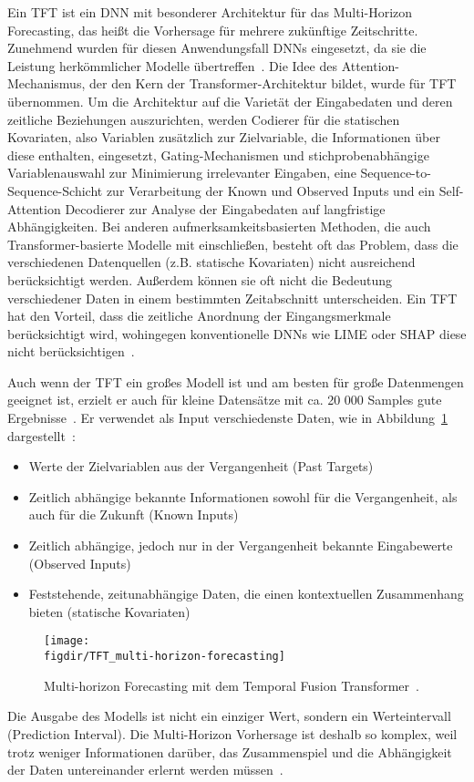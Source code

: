 Ein \ac{TFT} ist ein \ac{DNN} mit besonderer Architektur für das Multi-Horizon Forecasting, das heißt die Vorhersage für mehrere zukünftige Zeitschritte.
Zunehmend wurden für diesen Anwendungsfall \acp{DNN} eingesetzt, da sie die Leistung herkömmlicher Modelle übertreffen~\cite{Lim.19.12.2019}.
Die Idee des Attention-Mechanismus, der den Kern der Transformer-Architektur bildet, wurde für \ac{TFT} übernommen.
Um die Architektur auf die Varietät der Eingabedaten und deren zeitliche Beziehungen auszurichten, werden Codierer für die statischen Kovariaten, also Variablen zusätzlich zur Zielvariable, die Informationen über diese enthalten, eingesetzt, Gating-Mechanismen und stichprobenabhängige Variablenauswahl zur Minimierung irrelevanter Eingaben, eine Sequence-to-Sequence-Schicht zur Verarbeitung der Known und Observed Inputs und ein Self-Attention Decodierer zur Analyse der Eingabedaten auf langfristige Abhängigkeiten.
Bei anderen aufmerksamkeitsbasierten Methoden, die auch Transformer-basierte Modelle mit einschließen, besteht oft das Problem, dass die verschiedenen Datenquellen (z.B. statische Kovariaten) nicht ausreichend berücksichtigt werden.
Außerdem können sie oft nicht die Bedeutung verschiedener Daten in einem bestimmten Zeitabschnitt unterscheiden.
Ein \ac{TFT} hat den Vorteil, dass die zeitliche Anordnung der Eingangsmerkmale berücksichtigt wird, wohingegen konventionelle \acp{DNN} wie LIME oder SHAP diese nicht berücksichtigen~\cite{Lim.19.12.2019}.

Auch wenn der \ac{TFT} ein großes Modell ist und am besten für große Datenmengen geeignet ist, erzielt er auch für kleine Datensätze mit ca. 20 000 Samples gute Ergebnisse~\cite{Beitner.2020}.
Er verwendet als Input verschiedenste Daten, wie in Abbildung~\ref{FIG:tft-forecasting} dargestellt~\cite{Lim.19.12.2019}:
\begin{itemize}
 \item Werte der Zielvariablen aus der Vergangenheit (Past Targets)
 \item Zeitlich abhängige bekannte Informationen sowohl für die Vergangenheit, als auch für die Zukunft (Known Inputs)
 \item Zeitlich abhängige, jedoch nur in der Vergangenheit bekannte Eingabewerte (Observed Inputs)
 \item Feststehende, zeitunabhängige Daten, die einen kontextuellen Zusammenhang bieten (statische Kovariaten)
\end{itemize}
\begin{figure}
 \caption[Multi-horizon Forecasting mit dem Temporal Fusion Transformer]{Multi-horizon Forecasting mit dem Temporal Fusion Transformer~\cite{Lim.19.12.2019}.}
 {\texttt{[image: \\figdir/TFT\_multi-horizon-forecasting]}}
 \label{FIG:tft-forecasting}
\end{figure}
Die Ausgabe des Modells ist nicht ein einziger Wert, sondern ein Werteintervall (Prediction Interval).
Die Multi-Horizon Vorhersage ist deshalb so komplex, weil trotz weniger Informationen darüber, das Zusammenspiel und die Abhängigkeit der Daten untereinander erlernt werden müssen~\cite{Lim.19.12.2019}.


